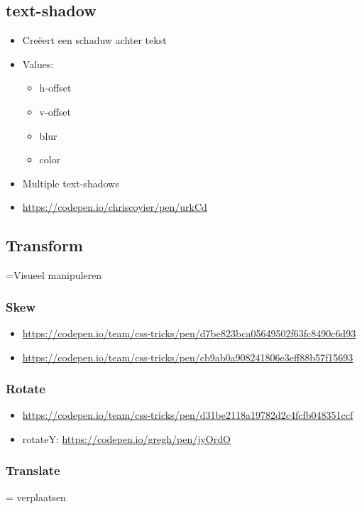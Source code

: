 \documentclass{article}
\begin{document}
\subsection{text-shadow}

\begin{itemize}
    \item Creëert een schaduw achter tekst
    \item Values:
    \begin{itemize}
        \item h-offset
        \item v-offset
        \item blur
        \item color
    \end{itemize}
    \item Multiple text-shadows
    \item \url{https://codepen.io/chriscoyier/pen/urkCd}
\end{itemize}

\subsection{Transform}

=Visueel manipuleren

\subsubsection{Skew}

\begin{itemize}
    \item \url{https://codepen.io/team/css-tricks/pen/d7be823bca05649502f63fc8490c6d93}
    \item \url{https://codepen.io/team/css-tricks/pen/cb9ab0a908241806e3eff88b57f15693}
\end{itemize}

\subsubsection{Rotate}

\begin{itemize}
    \item \url{https://codepen.io/team/css-tricks/pen/d31be2118a19782d2c4fcfb048351ccf}
    \item rotateY: \url{https://codepen.io/gregh/pen/jyOrdO}
\end{itemize}

\subsubsection{Translate}
= verplaatsen
\end{document}
